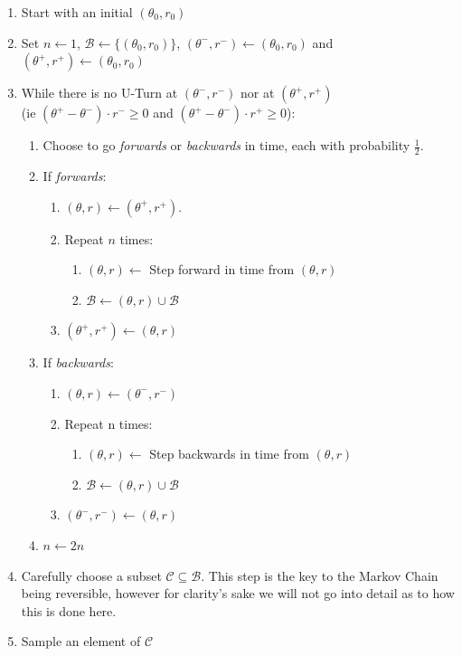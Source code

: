 \begin{enumerate}
    \item Start with an initial $(\theta_0, r_0)$
    \item Set $n\leftarrow1$, $\mathcal{B}\leftarrow \{(\theta_0, r_0)\}$, $(\theta^-, r^-) \leftarrow (\theta_0, r_0) $ and $(\theta^+, r^+) \leftarrow (\theta_0, r_0) $ 
    \item While there is no U-Turn at $(\theta^-, r^-)$ nor at $(\theta^+, r^+)$\\ (ie $(\theta^+ - \theta^-)\cdot r^- \geq 0$ and $(\theta^+ - \theta^-)\cdot r^+ \geq 0$): 
    \begin{enumerate}
        \item Choose to go \textit{forwards} or \textit{backwards} in time, each
        with probability $\frac{1}{2}$.

        \item If \textit{forwards}:
        \begin{enumerate}
            \item $(\theta, r) \leftarrow (\theta^+, r^+)$.
            \item Repeat $n$ times:
            \begin{enumerate}
                \item $(\theta, r) \leftarrow $ Step forward in time from $(\theta, r)$
                \item $\mathcal{B} \leftarrow (\theta, r) \cup \mathcal{B}$
            \end{enumerate}
            \item $(\theta^+, r^+) \leftarrow (\theta, r)$
        \end{enumerate}
        
        \item If \textit{backwards}:
        \begin{enumerate}
            \item $(\theta, r) \leftarrow (\theta^-, r^-)$

            \item Repeat n times:
            \begin{enumerate}
                \item $(\theta, r) \leftarrow $ Step backwards in time from $(\theta, r)$
                \item $\mathcal{B} \leftarrow (\theta, r) \cup \mathcal{B}$
            \end{enumerate}
            \item $(\theta^-, r^-) \leftarrow (\theta, r)$
    
        \end{enumerate}
        \item $n \leftarrow 2n$
    \end{enumerate}
    \item Carefully choose a subset $\mathcal{C} \subseteq \mathcal{B}$. This step is the key to the Markov Chain being reversible, however for clarity's sake we will not go into detail as to how this is done here.
    \item Sample an element of $\mathcal{C}$

\end{enumerate}


